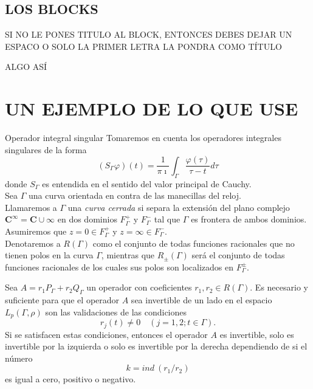 \documentclass[11pt]{beamer}
\begin{document}
\subsection{LOS BLOCKS}
\begin{frame}
\begin{block}

SI NO LE PONES TITULO AL BLOCK, ENTONCES DEBES DEJAR UN ESPACO O SOLO LA PRIMER LETRA LA PONDRA COMO TÍTULO
\end{block}
\begin{block}
ALGO ASÍ
\end{block}
\end{frame}

\section{UN EJEMPLO DE LO QUE USE}
\begin{frame}{Operador integral singular}
Tomaremos en cuenta los operadores integrales singulares de la forma \[(\textit{S}_{\Gamma}\varphi)(\textit{t})=\frac{1}{\pi \imath} \int_{\Gamma} \frac{\varphi(\tau)}{\tau-\textit{t}}d\tau\]
donde $\textit{S}_{\Gamma}$ es entendida en el sentido del valor principal de Cauchy.\\
Sea $\Gamma$ una curva orientada en contra de las manecillas del reloj. \\
\vspace{3mm}
Llamaremos a $\Gamma$ una \emph{curva cerrada} si separa la extensión del plano complejo $\textbf{C}^\infty=\textbf{C}\cup{\infty}$ en dos dominios $\textit{F}_{\Gamma}^{+}$ y $\textit{F}_{\Gamma}^{-}$ tal que $\Gamma$ es frontera de ambos dominios. Asumiremos que $z=0\in F_{\Gamma}^{+}$ y $z=\infty\in F_{\Gamma}^{-}$.\\
\vspace{3mm}
 Denotaremos a $\textit{R}(\Gamma)$ como el conjunto de todas funciones racionales que no tienen polos en la curva $\Gamma$, mientras que $\textit{R}_{\pm}(\Gamma)$ será el conjunto de todas funciones racionales de los cuales sus polos son localizados en $\textit{F}_{\Gamma}^{\pm}$.
\end{frame}

\begin{frame}
 \begin{theorem}[2]
	Sea $A=r_{1}P_{\Gamma}+r_{2}Q_{\Gamma}$ un operador con coeficientes $r_{1},r_{2}\in R(\Gamma)$. Es 			necesario y suficiente para que el operador $A$ sea invertible de un lado en el espacio $L_{p}(\Gamma,		\rho)$ son las validaciones de las condiciones \[r_{j}(t)\neq 0\quad(j=1,2;t\in \Gamma).\] Si se 	satisfacen estas condiciones, entonces el operador $A$ es invertible, solo es invertible por la izquierda 	o solo es invertible por la derecha dependiendo de si el número \[k=ind\:(r_{1}/r_{2})\] es igual a 	cero, positivo o negativo.
 \end{theorem}
\end{frame}
\end{document}

